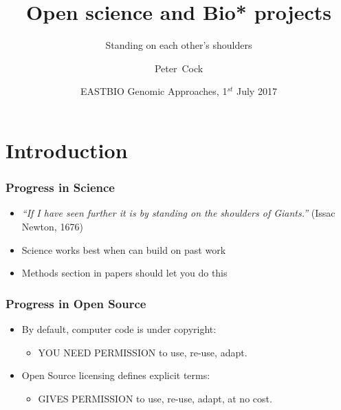 


\title[Open science and Bio* projects] %
{Open science and Bio* projects}
\subtitle{Standing on each other's shoulders}
\author[Cock] %
{Peter~Cock}
\date[July 2017] %
{EASTBIO Genomic Approaches, 1$^{st}$ July 2017}
\subject{Bioinformatics}





\frame[plain]{\titlepage}

\section{Introduction}

\begin{frame}
  \frametitle{Progress in Science}
  \begin{itemize}
    \item \emph{``If I have seen further it is by standing on the shoulders of Giants.''} (Issac Newton, 1676)
    \item Science works best when can build on past work
    \item Methods section in papers should let you do this
  \end{itemize}
\end{frame}

\begin{frame}
  \frametitle{Progress in Open Source}
  \begin{itemize}
    \item By default, computer code is under copyright:
      \begin{itemize}
        \item YOU NEED PERMISSION to use, re-use, adapt.
      \end{itemize}
    \item Open Source licensing defines explicit terms:
      \begin{itemize}
        \item GIVES PERMISSION to use, re-use, adapt, at no cost.
      \end{itemize}
  \end{itemize}
\end{frame}

